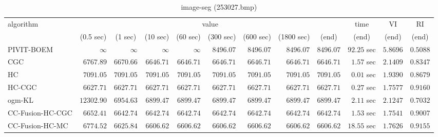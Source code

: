 \begin{table}[H]
\scriptsize
\centering
\caption{image-seg (253027.bmp)}
\label{tab:anytimetable-image-seg-253027.bmp}
\begin{tabular}{lrrrrrrrrrrr}
\toprule
           algorithm &                                   \multicolumn{8}{c}{value} & \multicolumn{1}{c}{time}    & \multicolumn{1}{c}{VI}  & \multicolumn{1}{c}{RI} \\  
\cmidrule(lr){2-9}\cmidrule(lr){10-10} \cmidrule(lr){11-11} \cmidrule(lr){12-12}   
                     & \multicolumn{1}{c}{(0.5 sec)} & \multicolumn{1}{c}{(1 sec)} & \multicolumn{1}{c}{(10 sec)} & \multicolumn{1}{c}{(60 sec)} & \multicolumn{1}{c}{(300 sec)} & \multicolumn{1}{c}{(600 sec)} & \multicolumn{1}{c}{(1800 sec)} & \multicolumn{1}{c}{(end)} & \multicolumn{1}{c}{(end)}    & \multicolumn{1}{c}{(end)}   & \multicolumn{1}{c}{(end)}  \\ \midrule 
          PIVIT-BOEM & $\infty$ & $\infty$ & $\infty$ & $\infty$ & $      8496.07$ & $      8496.07$ & $      8496.07$ & $      8496.07$ & $        92.25$ sec    & $       5.8696$  & $       0.5088$ \\ 
                 CGC & $      6767.89$ & $      6670.66$ & $      6646.71$ & $      6646.71$ & $      6646.71$ & $      6646.71$ & $      6646.71$ & $      6646.71$ & $         1.57$ sec    & $       2.1409$  & $       0.8347$ \\ 
                  HC & $      7091.05$ & $      7091.05$ & $      7091.05$ & $      7091.05$ & $      7091.05$ & $      7091.05$ & $      7091.05$ & $      7091.05$ & $         0.01$ sec    & $       1.9390$  & $       0.8679$ \\ 
              HC-CGC & $      6627.71$ & $      6627.71$ & $      6627.71$ & $      6627.71$ & $      6627.71$ & $      6627.71$ & $      6627.71$ & $      6627.71$ & $         0.27$ sec    & $       1.7577$  & $       0.9160$ \\ 
              ogm-KL & $     12302.90$ & $      6954.63$ & $      6899.47$ & $      6899.47$ & $      6899.47$ & $      6899.47$ & $      6899.47$ & $      6899.47$ & $         2.11$ sec    & $       2.1247$  & $       0.7032$ \\ 
    CC-Fusion-HC-CGC & $      6652.41$ & $      6642.74$ & $      6642.74$ & $      6642.74$ & $      6642.74$ & $      6642.74$ & $      6642.74$ & $      6642.74$ & $         1.53$ sec    & $       1.7541$  & $       0.9007$ \\ 
     CC-Fusion-HC-MC & $      6774.52$ & $      6625.84$ & $      6606.62$ & $      6606.62$ & $      6606.62$ & $      6606.62$ & $      6606.62$ & $      6606.62$ & $        18.55$ sec    & $       1.7626$  & $       0.9155$ \\ 

\end{tabular}
\end{table}
